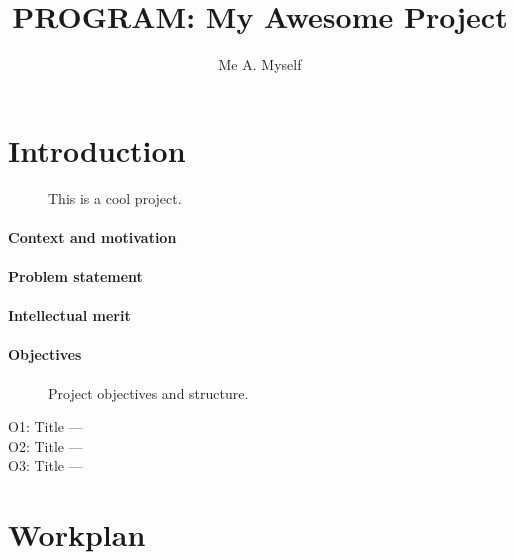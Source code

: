 \documentclass{nsf}
\title{PROGRAM: My Awesome Project}
\author{Me A. Myself}
\begin{document}
\maketitle

\section{Introduction}
\label{sec:introduction}

\begin{wrapfigure}[14]{r}{.5\textwidth}
  \centering
  \caption{This is a cool project.}
  \label{fig:concept}
\end{wrapfigure}
\paragraph{Context and motivation}
\lipsum[1]

\paragraph{Problem statement}
\lipsum[1]

\paragraph{Intellectual merit}
\lipsum[1]

\paragraph{Objectives}
\lipsum[1]
\begin{figure}[t]
  \centering
  \caption{Project objectives and structure.}
  \label{fig:objectives}
\end{figure}

\begin{description}
\item[O1: Title —] \lipsum[1]
\item[O2: Title —] \lipsum[1]
\item[O3: Title —] \lipsum[1]
\end{description}

\section{Workplan}
\label{sec:workplan}
\end{document}
